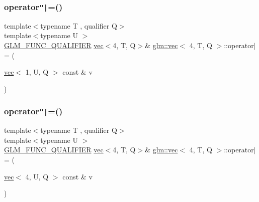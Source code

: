 \mbox{\label{structglm_1_1vec_3_014_00_01_t_00_01_q_01_4_a3d9704513aa8df8d05bc30d20dd6bc71}} 
\subsubsection{\texorpdfstring{operator\texttt{"|}=()}{operator|=()}\hspace{0.1cm}{\footnotesize\ttfamily [5/6]}}
{\footnotesize\ttfamily template$<$typename T , qualifier Q$>$ \\
template$<$typename U $>$ \\
\hyperlink{setup_8hpp_a33fdea6f91c5f834105f7415e2a64407}{G\+L\+M\+\_\+\+F\+U\+N\+C\+\_\+\+Q\+U\+A\+L\+I\+F\+I\+ER} \hyperlink{structglm_1_1vec}{vec}$<$4, T, Q$>$\& \hyperlink{structglm_1_1vec}{glm\+::vec}$<$ 4, T, Q $>$\+::operator$\vert$= (\begin{DoxyParamCaption}\item[{\hyperlink{structglm_1_1vec}{vec}$<$ 1, U, Q $>$ const \&}]{v }\end{DoxyParamCaption})}

\mbox{\label{structglm_1_1vec_3_014_00_01_t_00_01_q_01_4_aea8bc26beedb4f4fbb6a4d0ad4e02a86}} 
\subsubsection{\texorpdfstring{operator\texttt{"|}=()}{operator|=()}\hspace{0.1cm}{\footnotesize\ttfamily [6/6]}}
{\footnotesize\ttfamily template$<$typename T , qualifier Q$>$ \\
template$<$typename U $>$ \\
\hyperlink{setup_8hpp_a33fdea6f91c5f834105f7415e2a64407}{G\+L\+M\+\_\+\+F\+U\+N\+C\+\_\+\+Q\+U\+A\+L\+I\+F\+I\+ER} \hyperlink{structglm_1_1vec}{vec}$<$4, T, Q$>$\& \hyperlink{structglm_1_1vec}{glm\+::vec}$<$ 4, T, Q $>$\+::operator$\vert$= (\begin{DoxyParamCaption}\item[{\hyperlink{structglm_1_1vec}{vec}$<$ 4, U, Q $>$ const \&}]{v }\end{DoxyParamCaption})}



